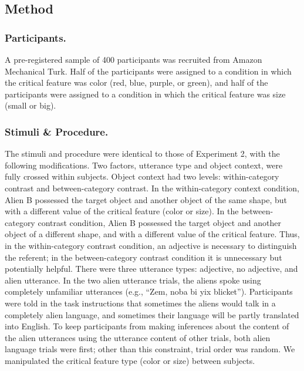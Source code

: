 \documentclass{ucetd}
\begin{document}
\hypertarget{method-2}{%
\subsection{Method}\label{method-2}}

\hypertarget{participants.-1}{%
\subsubsection{Participants.}\label{participants.-1}}

A pre-registered sample of 400 participants was recruited from Amazon
Mechanical Turk. Half of the participants were assigned to a condition
in which the critical feature was color (red, blue, purple, or green),
and half of the participants were assigned to a condition in which the
critical feature was size (small or big).

\hypertarget{stimuli-procedure.-1}{%
\subsubsection{Stimuli \& Procedure.}\label{stimuli-procedure.-1}}

The stimuli and procedure were identical to those of Experiment 2, with
the following modifications. Two factors, utterance type and object
context, were fully crossed within subjects. Object context had two
levels: within-category contrast and between-category contrast. In the
within-category context condition, Alien B possessed the target object
and another object of the same shape, but with a different value of the
critical feature (color or size). In the between-category contrast
condition, Alien B possessed the target object and another object of a
different shape, and with a different value of the critical feature.
Thus, in the within-category contrast condition, an adjective is
necessary to distinguish the referent; in the between-category contrast
condition it is unnecessary but potentially helpful. There were three
utterance types: adjective, no adjective, and alien utterance. In the
two alien utterance trials, the aliens spoke using completely unfamiliar
utterances (e.g., ``Zem, noba bi yix blicket''). Participants were told
in the task instructions that sometimes the aliens would talk in a
completely alien language, and sometimes their language will be partly
translated into English. To keep participants from making inferences
about the content of the alien utterances using the utterance content of
other trials, both alien language trials were first; other than this
constraint, trial order was random. We manipulated the critical feature
type (color or size) between subjects.
\end{document}
